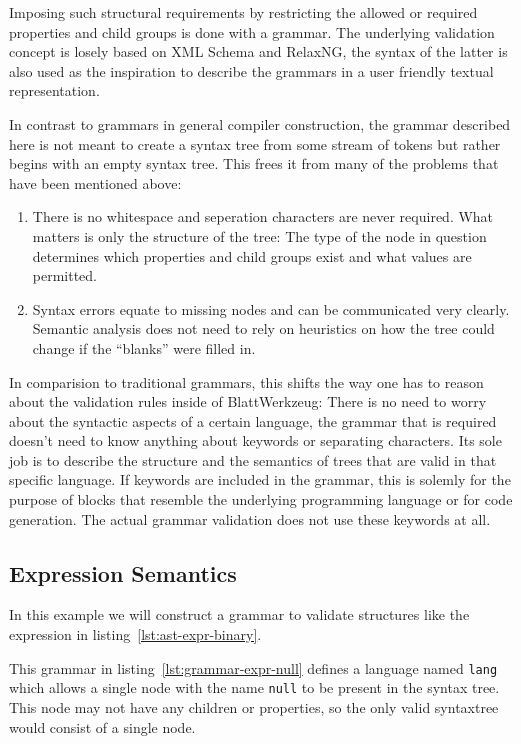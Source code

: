 \documentclass[sigconf,review=true]{acmart}
\begin{document}
Imposing such structural requirements by restricting the allowed or required properties and child groups is done with a grammar. The underlying validation concept is losely based on XML Schema and RelaxNG, the syntax of the latter is also used as the inspiration to describe the grammars in a user friendly textual representation.

In contrast to grammars in general compiler construction, the grammar described here is not meant to create a syntax tree from some stream of tokens but rather begins with an empty syntax tree. This frees it from many of the problems that have been mentioned above:

\begin{enumerate}
\item There is no whitespace and seperation characters are never required. What matters is only the structure of the tree: The type of the node in question determines which properties and child groups exist and what values are permitted.
\item Syntax errors equate to missing nodes and can be communicated very clearly. Semantic analysis does not need to rely on heuristics on how the tree could change if the \enquote{blanks} were filled in.
\end{enumerate}

In comparision to traditional grammars, this shifts the way one has to reason about the validation rules inside of BlattWerkzeug: There is no need to worry about the syntactic aspects of a certain language, the grammar that is required doesn’t need to know anything about keywords or separating characters. Its sole job is to describe the structure and the semantics of trees that are valid in that specific language. If keywords are included in the grammar, this is solemly for the purpose of blocks that resemble the underlying programming language or for code generation. The actual grammar validation does not use these keywords at all.

\subsection{Expression Semantics}

In this example we will construct a grammar to validate structures like the expression in listing~\ref{lst:ast-expr-binary}.

This grammar in listing~\ref{lst:grammar-expr-null} defines a language named \texttt{lang} which allows a single node with the name \texttt{null} to be present in the syntax tree. This node may not have any children or properties, so the only valid syntaxtree would consist of a single node.
\end{document}
